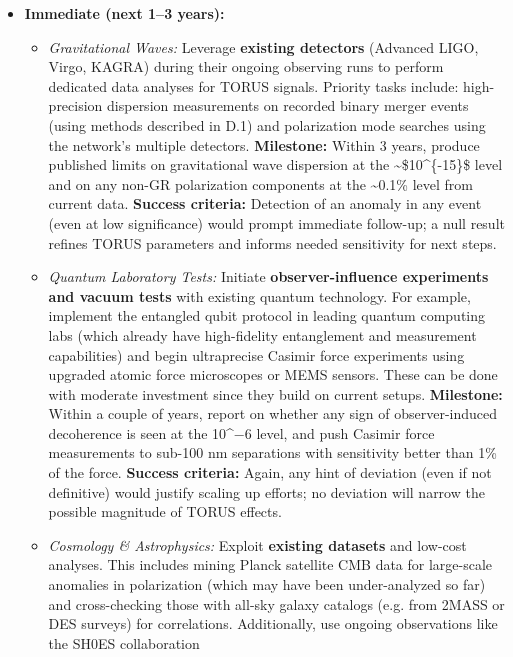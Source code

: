 \begin{itemize}
\item
  \textbf{Immediate (next 1--3 years):}

  \begin{itemize}
  \item
    \emph{Gravitational Waves:} Leverage \textbf{existing detectors}
    (Advanced LIGO, Virgo, KAGRA) during their ongoing observing runs to
    perform dedicated data analyses for TORUS signals. Priority tasks
    include: high-precision dispersion measurements on recorded binary
    merger events (using methods described in D.1) and polarization mode
    searches using the network's multiple detectors. \textbf{Milestone:}
    Within 3 years, produce published limits on gravitational wave
    dispersion at the \textasciitilde{}\$10\^{}\{-15\}\$ level and on
    any non-GR polarization components at the \textasciitilde{}0.1\%
    level from current data. \textbf{Success criteria:} Detection of an
    anomaly in any event (even at low significance) would prompt
    immediate follow-up; a null result refines TORUS parameters and
    informs needed sensitivity for next steps.
  \item
    \emph{Quantum Laboratory Tests:} Initiate \textbf{observer-influence
    experiments and vacuum tests} with existing quantum technology. For
    example, implement the entangled qubit protocol in leading quantum
    computing labs (which already have high-fidelity entanglement and
    measurement capabilities) and begin ultraprecise Casimir force
    experiments using upgraded atomic force microscopes or MEMS sensors.
    These can be done with moderate investment since they build on
    current setups. \textbf{Milestone:} Within a couple of years, report
    on whether any sign of observer-induced decoherence is seen at the
    10\^{}−6 level, and push Casimir force measurements to sub-100 nm
    separations with sensitivity better than 1\% of the force.
    \textbf{Success criteria:} Again, any hint of deviation (even if not
    definitive) would justify scaling up efforts; no deviation will
    narrow the possible magnitude of TORUS effects.
  \item
    \emph{Cosmology \& Astrophysics:} Exploit \textbf{existing datasets}
    and low-cost analyses. This includes mining Planck satellite CMB
    data for large-scale anomalies in polarization (which may have been
    under-analyzed so far) and cross-checking those with all-sky galaxy
    catalogs (e.g. from 2MASS or DES surveys) for correlations.
    Additionally, use ongoing observations like the SH0ES collaboration

\end{itemize}
\end{itemize}
